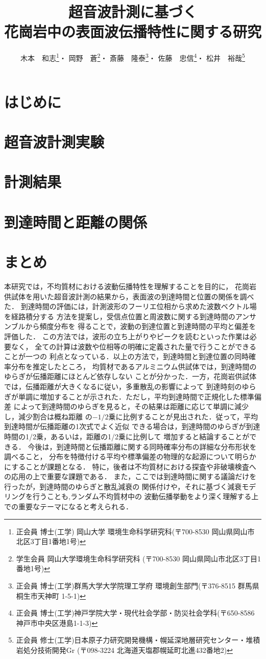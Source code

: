 \documentclass{jsce}
\title{
	超音波計測に基づく\\花崗岩中の表面波伝播特性に関する研究
}%
\author{木本　和志\thanks{正会員 博士(工学) 岡山大学 環境生命科学研究科(〒700-8530 岡山県岡山市北区3丁目1番地1号)\email{kimoto@okayama-u.ac.jp}}・
岡野　蒼\thanks{学生会員 岡山大学環境生命科学研究科 (〒700-8530 岡山県岡山市北区3丁目1番地1号)}・
斎藤　隆泰\thanks{正会員 博士(工学)群馬大学大学院理工学府 環境創生部門(〒376-8515 群馬県桐生市天神町 1-5-1)}・
佐藤　忠信\thanks{正会員 博士(工学)神戸学院大学・現代社会学部・防災社会学科(〒650-8586神戸市中央区港島1-1-3)}・
松井　裕哉\thanks{正会員 修士(工学)日本原子力研究開発機構・幌延深地層研究センター・堆積岩処分技術開発Gr
(〒098-3224 北海道天塩郡幌延町北進432番地2)}
}
\begin{document}
\maketitle
\section{はじめに}
	
\section{超音波計測実験}
	
\section{計測結果}
	
\section{到達時間と距離の関係 }
	
\section{まとめ}
本研究では，不均質材における波動伝播特性を理解することを目的に，
花崗岩供試体を用いた超音波計測の結果から，表面波の到達時間と位置の関係を調べた．
到達時間の評価には，計測波形のフーリエ位相から求めた波数ベクトル場を経路積分する
方法を提案し，受信点位置と周波数に関する到達時間のアンサンブルから頻度分布を
得ることで，波動の到達位置と到達時間の平均と偏差を評価した．
この方法では，波形の立ち上がりやピークを読むといった作業は必要なく，
全ての計算は波数や位相等の明確に定義された量で行うことができることが一つの
利点となっている．以上の方法で，到達時間と到達位置の同時確率分布を推定したところ，
均質材であるアルミニウム供試体では，到達時間のゆらぎが伝播距離にほとんど依存しない
ことが分かった．一方，花崗岩供試体では，伝播距離が大きくなるに従い，多重散乱の影響によって
到達時刻のゆらぎが単調に増加することが示された．ただし，平均到達時間で正規化した標準偏差
によって到達時間のゆらぎを見ると，その結果は距離に応じて単調に減少し，減少割合は概ね距離
の$-1/2$乗に比例することが見出された．従って，平均到達時間が伝播距離の1次式でよく近似
できる場合は，到達時間のゆらぎが到達時間の1/2乗，あるいは，距離の1/2乗に比例して
増加すると結論することができる．
今後は，到達時間と伝播距離に関する同時確率分布の詳細な分布形状を調べること，
分布を特徴付ける平均や標準偏差の物理的な起源について明らかにすることが課題となる．
特に，後者は不均質材における探査や非破壊検査への応用の上で重要な課題である．
また，ここでは到達時間に関する議論だけを行ったが，到達時間のゆらぎと散乱減衰の
関係付けや，それに基づく減衰モデリングを行うことも,ランダム不均質材中の
波動伝播挙動をより深く理解する上での重要なテーマになると考えられる．
\\
\end{document}
